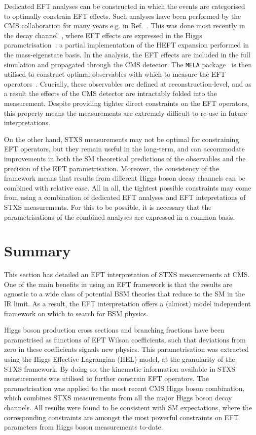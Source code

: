 Dedicated EFT analyses can be constructed in which the events are categorised to optimally constrain EFT effects. Such analyses have been performed by the CMS collaboration for many years e.g. in Ref.~\cite{Khachatryan:2014kca}. This was done most recently in the \Hfl decay channel~\cite{CMS-PAS-HIG-19-009}, where EFT effects are expressed in the Higgs parametrisation~\cite{deFlorian:2016spz}: a partial implementation of the HEFT expansion performed in the mass-eigenstate basis. In the analysis, the EFT effects are included in the full simulation and propagated through the CMS detector. The \texttt{MELA} package~\cite{Gritsan:2016hjl} is then utilised to construct optimal observables with which to measure the EFT operators~\cite{Brehmer:2019bvj}. Crucially, these observables are defined at reconstruction-level, and as a result the effects of the CMS detector are intractably folded into the measurement. Despite providing tighter direct constraints on the EFT operators, this property means the measurements are extremely difficult to re-use in future interpretations.

On the other hand, STXS measurements may not be optimal for constraining EFT operators, but they remain useful in the long-term, and can accommodate improvements in both the SM theoretical predictions of the observables and the precision of the EFT parametrisation. Moreover, the consistency of the framework means that results from different Higgs boson decay channels can be combined with relative ease. All in all, the tightest possible constraints may come from using a combination of dedicated EFT analyses and EFT intepretations of STXS measurements. For this to be possible, it is necessary that the parametrisations of the combined analyses are expressed in a common basis. 

\section{Summary}
This section has detailed an EFT interpretation of STXS measurements at CMS. One of the main benefits in using an EFT framework is that the results are agnostic to a wide class of potential BSM theories that reduce to the SM in the IR limit. As a result, the EFT interpretation offers a (almost) model independent framework on which to search for BSM physics. 

Higgs boson production cross sections and branching fractions have been parametrised as functions of EFT Wilson coefficients, such that deviations from zero in these coefficients signals new physics. This parametrisation was extracted using the Higgs Effective Lagrangian (HEL) model, at the granularity of the STXS framework. By doing so, the kinematic information available in STXS measurements was utilised to further constrain EFT operators. The parametrisation was applied to the most recent CMS Higgs boson combination, which combines STXS measurements from all the major Higgs boson decay channels. All results were found to be consistent with SM expectations, where the corresponding constraints are amongst the most powerful constraints on EFT parameters from Higgs boson measurements to-date. 

